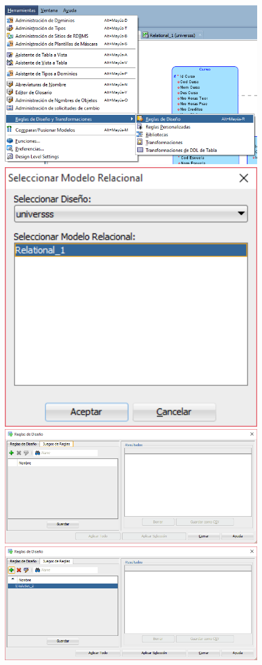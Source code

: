 \documentclass[a4paper,openright,12pt]{book}
\begin{document}
\begin{center}
\includegraphics[width=11cm]{./images/5-1 Ejercicio 3/1.png}\\
\includegraphics[width=11cm]{./images/5-1 Ejercicio 3/2.png}\\
\includegraphics[width=11cm]{./images/5-1 Ejercicio 3/3.png}\\
\includegraphics[width=11cm]{./images/5-1 Ejercicio 3/4.png}\\

\end{center}
\end{document}
